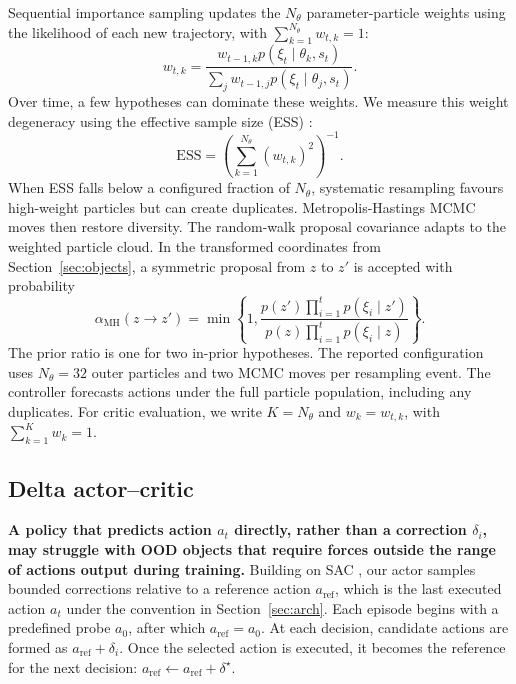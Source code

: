 \documentclass[12pt]{article}
\begin{document}
Sequential importance sampling updates the $N_\theta$ parameter-particle weights using the likelihood of each new trajectory, with $\sum_{k=1}^{N_\theta}w_{t,k}=1$:
\begin{equation}
w_{t,k}=\frac{w_{t-1,k}p(\xi_t\mid \theta_k,s_t)}
{\sum_j w_{t-1,j}p(\xi_t\mid \theta_j,s_t)}.
\label{eq:weightupdate}\end{equation}
Over time, a few hypotheses can dominate these weights. We measure this weight degeneracy using the effective sample size (ESS) \cite{smc2}:
\begin{equation*}\mathrm{ESS}=\left(\sum_{k=1}^{N_\theta}(w_{t,k})^2\right)^{-1}.\end{equation*}
When ESS falls below a configured fraction of $N_\theta$, systematic resampling favours high-weight particles but can create duplicates. Metropolis-Hastings MCMC moves \cite{hastings1970} then restore diversity. The random-walk proposal covariance adapts to the weighted particle cloud. In the transformed coordinates from Section~\ref{sec:objects}, a symmetric proposal from $z$ to $z'$ is accepted with probability
\begin{equation}\label{eq:mh-accept}
\alpha_{\mathrm{MH}}(z\to z')=\min\left\{1,\frac{p(z')\prod_{i=1}^{t}p(\xi_i\mid z')}{p(z)\prod_{i=1}^{t}p(\xi_i\mid z)}\right\}.
\end{equation}
The prior ratio is one for two in-prior hypotheses. The reported configuration uses $N_\theta=32$ outer particles and two MCMC moves per resampling event. The controller forecasts actions under the full particle population, including any duplicates. For critic evaluation, we write $K=N_\theta$ and $w_k=w_{t,k}$, with $\sum_{k=1}^{K}w_k=1$.

\subsection{Delta actor--critic}\label{sec:delta}
\textbf{A policy that predicts action $a_t$ directly, rather than a correction $\delta_i$, may struggle with OOD objects that require forces outside the range of actions output during training.} Building on SAC \cite{sac,sacauto}, our actor samples bounded corrections relative to a reference action $a_{\mathrm{ref}}$, which is the last executed action $a_t$ under the convention in Section~\ref{sec:arch}. Each episode begins with a predefined probe $a_0$, after which $a_{\mathrm{ref}}=a_0$. At each decision, candidate actions are formed as $a_{\mathrm{ref}}+\delta_i$. Once the selected action is executed, it becomes the reference for the next decision: $a_{\mathrm{ref}}\leftarrow a_{\mathrm{ref}}+\delta^\star$.
\end{document}
